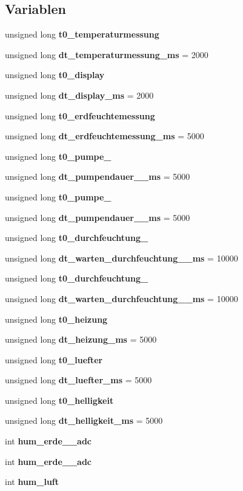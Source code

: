 \subsection*{Variablen}
\begin{DoxyCompactItemize}
\item 
unsigned long \textbf{ t0\+\_\+temperaturmessung}
\item 
unsigned long \textbf{ dt\+\_\+temperaturmessung\+\_\+ms} = 2000
\item 
unsigned long \textbf{ t0\+\_\+display}
\item 
unsigned long \textbf{ dt\+\_\+display\+\_\+ms} = 2000
\item 
unsigned long \textbf{ t0\+\_\+erdfeuchtemessung}
\item 
unsigned long \textbf{ dt\+\_\+erdfeuchtemessung\+\_\+ms} = 5000
\item 
unsigned long \textbf{ t0\+\_\+pumpe\+\_}
\item 
unsigned long \textbf{ dt\+\_\+pumpendauer\+\_\+\_\+ms} = 5000
\item 
unsigned long \textbf{ t0\+\_\+pumpe\+\_}
\item 
unsigned long \textbf{ dt\+\_\+pumpendauer\+\_\+\_\+ms} = 5000
\item 
unsigned long \textbf{ t0\+\_\+durchfeuchtung\+\_}
\item 
unsigned long \textbf{ dt\+\_\+warten\+\_\+durchfeuchtung\+\_\+\_\+ms} = 10000
\item 
unsigned long \textbf{ t0\+\_\+durchfeuchtung\+\_}
\item 
unsigned long \textbf{ dt\+\_\+warten\+\_\+durchfeuchtung\+\_\+\_\+ms} = 10000
\item 
unsigned long \textbf{ t0\+\_\+heizung}
\item 
unsigned long \textbf{ dt\+\_\+heizung\+\_\+ms} = 5000
\item 
unsigned long \textbf{ t0\+\_\+luefter}
\item 
unsigned long \textbf{ dt\+\_\+luefter\+\_\+ms} = 5000
\item 
unsigned long \textbf{ t0\+\_\+helligkeit}
\item 
unsigned long \textbf{ dt\+\_\+helligkeit\+\_\+ms} = 5000
\item 
int \textbf{ hum\+\_\+erde\+\_\+\_\+adc}
\item 
int \textbf{ hum\+\_\+erde\+\_\+\_\+adc}
\item 
int \textbf{ hum\+\_\+luft}
\item 

\end{DoxyCompactItemize}
